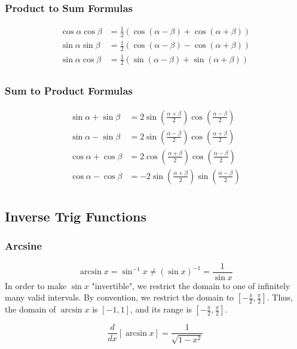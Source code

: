 \documentclass{article}
\begin{document}
\subsubsection{Product to Sum Formulas}
\begin{align*}
    \cos{\alpha}\cos{\beta}&=\frac{1}{2}\left(\cos\left(\alpha-\beta\right)+\cos{\left(\alpha+\beta\right)}\right)\\
    \sin{\alpha}\sin{\beta}&=\frac{1}{2}\left(\cos\left(\alpha-\beta\right)-\cos{\left(\alpha+\beta\right)}\right)\\
    \sin{\alpha}\cos{\beta}&=\frac{1}{2}\left(\sin\left(\alpha-\beta\right)+\sin{\left(\alpha+\beta\right)}\right)\\
\end{align*}

\subsubsection{Sum to Product Formulas}
\begin{align*}
    \sin{\alpha}+\sin{\beta}&=2\sin{\left(\frac{\alpha+\beta}{2}\right)}\cos{\left(\frac{\alpha-\beta}{2}\right)}\\
    \sin{\alpha}-\sin{\beta}&=2\sin{\left(\frac{\alpha-\beta}{2}\right)}\cos{\left(\frac{\alpha+\beta}{2}\right)}\\
    \cos{\alpha}+\cos{\beta}&=2\cos{\left(\frac{\alpha+\beta}{2}\right)}\cos{\left(\frac{\alpha-\beta}{2}\right)}\\
    \cos{\alpha}-\cos{\beta}&=-2\sin{\left(\frac{\alpha+\beta}{2}\right)}\sin{\left(\frac{\alpha-\beta}{2}\right)}\\
\end{align*}

\subsection{Inverse Trig Functions}
\subsubsection{Arcsine}
$$\arcsin{x}=\sin^{-1}x\ne\left(\sin{x}\right)^{-1}=\frac{1}{\sin{x}}$$
In order to make $\sin{x}$ "invertible", we restrict the domain to one of infinitely many valid intervals. By convention, we restrict the domain to $\left[-\frac{\pi}{2},\frac{\pi}{2}\right]$. Thus, the domain of $\arcsin{x}$ is $[-1,1]$, and its range is $\left[-\frac{\pi}{2},\frac{\pi}{2}\right]$.

$$\frac{d}{dx}\left[\arcsin{x}\right]=\frac{1}{\sqrt{1-x^2}}$$
\end{document}
